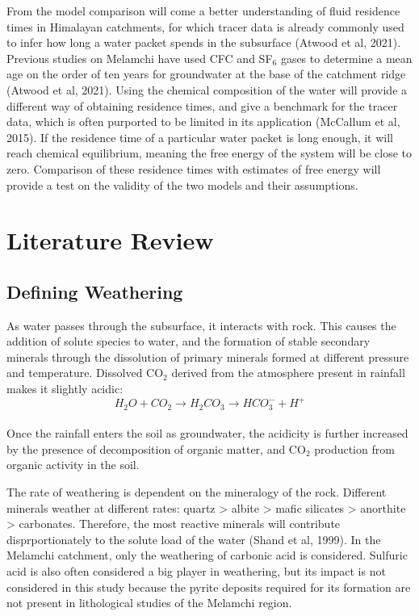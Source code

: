 \bsk

From the model comparison will come a better understanding of fluid residence times in Himalayan catchments, for which tracer data is already commonly used to infer how long a water packet spends in the subsurface (Atwood et al, 2021). Previous studies on Melamchi have used CFC and SF$_6$ gases to determine a mean age on the order of ten years for groundwater at the base of the catchment ridge (Atwood et al, 2021). Using the chemical composition of the water will provide a different way of obtaining residence times, and give a benchmark for the tracer data, which is often purported to be limited in its application (McCallum et al, 2015). If the residence time of a particular water packet is long enough, it will reach chemical equilibrium, meaning the free energy of the system will be close to zero. Comparison of these residence times with estimates of free energy will provide a test on the validity of the two models and their assumptions.


\newpage

\section{Literature Review}

\subsection{Defining Weathering}

As water passes through the subsurface, it interacts with rock. This causes the addition of solute species to water, and the formation of stable secondary minerals through the dissolution of primary minerals formed at different pressure and temperature. Dissolved CO$_2$ derived from the atmosphere present in rainfall makes it slightly acidic:\\
\begin{equation}
H_2O + CO_2 \rightarrow H_2CO_3 \rightarrow HCO_3^- + H^+
\end{equation}\\
Once the rainfall enters the soil as groundwater, the acidicity is further increased by the presence of decomposition of organic matter, and CO$_2$ production from organic activity in the soil.

\bsk

The rate of weathering is dependent on the mineralogy of the rock. Different minerals weather at different rates: quartz > albite > mafic silicates > anorthite > carbonates. Therefore, the most reactive minerals will contribute disprportionately to the solute load of the water (Shand et al, 1999). In the Melamchi catchment, only the weathering of carbonic acid is considered. Sulfuric acid is also often considered a big player in weathering, but its impact is not considered in this study because the pyrite deposits required for its formation are not present in lithological studies of the Melamchi region.

